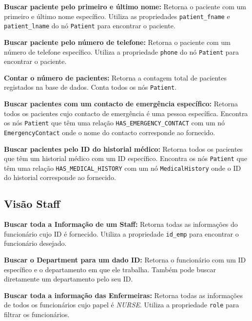 \vspace{0.15cm} 
\textbf{Buscar paciente pelo primeiro e último nome:} Retorna o paciente com um primeiro e último nome específico. Utiliza as propriedades \texttt{patient\_fname} e \texttt{patient\_lname} do nó \texttt{Patient} para encontrar o paciente.

\vspace{0.15cm} 
\textbf{Buscar paciente pelo número de telefone:} Retorna o paciente com um número de telefone específico. Utiliza a propriedade \texttt{phone} do nó \texttt{Patient} para encontrar o paciente.

\vspace{0.15cm} 
\textbf{Contar o número de pacientes:} Retorna a contagem total de pacientes registados na base de dados. Conta todos os nós \texttt{Patient}.

\vspace{0.15cm} 
\textbf{Buscar pacientes com um contacto de emergência específico:} Retorna todos os pacientes cujo contacto de emergência é uma pessoa específica. Encontra os nós \texttt{Patient} que têm uma relação \texttt{HAS\_EMERGENCY\_CONTACT} com um nó \texttt{EmergencyContact} onde o nome do contacto corresponde ao fornecido.

\vspace{0.15cm} 
\textbf{Buscar pacientes pelo ID do historial médico:} Retorna todos os pacientes que têm um historial médico com um ID específico. Encontra os nós \texttt{Patient} que têm uma relação \texttt{HAS\_MEDICAL\_HISTORY} com um nó \texttt{MedicalHistory} onde o ID do historial corresponde ao fornecido.

\subsection{Visão Staff}

\vspace{0.15cm}
\textbf{Buscar toda a Informação de um Staff:} Retorna todas as informações do funcionário cujo ID é fornecido. Utiliza a propriedade \texttt{id\_emp} para encontrar o funcionário desejado.

\vspace{0.15cm}
\textbf{Buscar o Department para um dado ID:} Retorna o funcionário com um ID específico e o departamento em que ele trabalha. Também pode buscar diretamente um departamento pelo seu ID.

\vspace{0.15cm}
\textbf{Buscar toda a informação das Enfermeiras:} Retorna todas as informações de todos os funcionários cujo papel é \textit{NURSE}. Utiliza a propriedade \texttt{role} para filtrar os funcionários.

